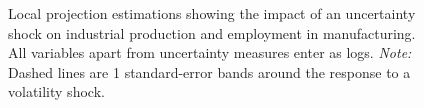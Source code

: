 \documentclass[a4paper,11pt,listof=nochaptergap,oneside,pointednumbers,bibtotoc,bigheadings,liststotoc]{scrbook}
\theoremstyle{mysatz}
\theoremstyle{mydefinition}
\theoremstyle{mybemerkung}
\begin{document}
\begin{itemize}
\begin{figure}[!h]
   \centering
   \setlength\fboxsep{0pt}
   \setlength\fboxrule{0pt}
      \caption[Local projection estimations showing the impact of an uncertainty shock on industrial production and employment in manufacturing. All variables apart from uncertainty measures enter as logs.]{Local projection estimations showing the impact of an uncertainty shock on industrial production and employment in manufacturing. All variables apart from uncertainty measures enter as logs.
      \textit{Note:} Dashed lines are 1 standard-error bands around the response to a volatility shock.}
   \label{fig:locproj_plot_all_NoHP_until2008}
\end{figure}



\end{itemize}
\end{document}

